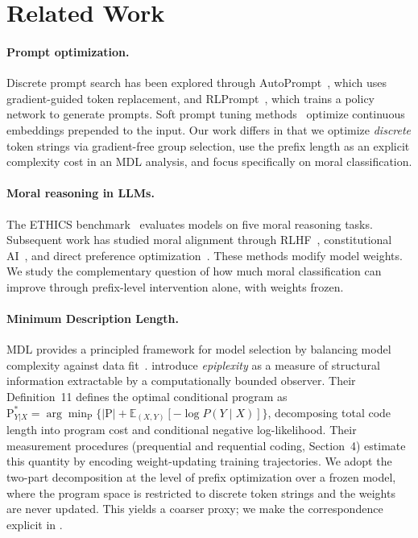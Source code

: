 \documentclass[preprint]{article}
\begin{document}
\section{Related Work}
\label{sec:related}

\paragraph{Prompt optimization.}
Discrete prompt search has been explored through AutoPrompt~\citep{shin2020autoprompt}, which uses gradient-guided token replacement, and RLPrompt~\citep{deng2022rlprompt}, which trains a policy network to generate prompts.
Soft prompt tuning methods~\citep{lester2021prompt, li2021prefix} optimize continuous embeddings prepended to the input.
Our work differs in that we optimize \emph{discrete} token strings via gradient-free group selection, use the prefix length as an explicit complexity cost in an MDL analysis, and focus specifically on moral classification.

\paragraph{Moral reasoning in LLMs.}
The ETHICS benchmark~\citep{hendrycks2021ethics} evaluates models on five moral reasoning tasks.
Subsequent work has studied moral alignment through RLHF~\citep{ouyang2022training}, constitutional AI~\citep{bai2022constitutional}, and direct preference optimization~\citep{rafailov2023dpo}.
These methods modify model weights.
We study the complementary question of how much moral classification can improve through prefix-level intervention alone, with weights frozen.

\paragraph{Minimum Description Length.}
MDL provides a principled framework for model selection by balancing model complexity against data fit~\citep{rissanen2004mdl, grunwald2007mdl}.
\citet{finzi2026epiplexity} introduce \emph{epiplexity} as a measure of structural information extractable by a computationally bounded observer.
Their Definition~11 defines the optimal conditional program as $\mathrm{P}^*_{Y|X} = \arg\min_{\mathrm{P}} \{|\mathrm{P}| + \mathbb{E}_{(X,Y)}[-\log P(Y \mid X)]\}$, decomposing total code length into program cost and conditional negative log-likelihood.
Their measurement procedures (prequential and requential coding, Section~4) estimate this quantity by encoding weight-updating training trajectories.
We adopt the two-part decomposition at the level of prefix optimization over a frozen model, where the program space is restricted to discrete token strings and the weights are never updated.
This yields a coarser proxy; we make the correspondence explicit in .
\end{document}
